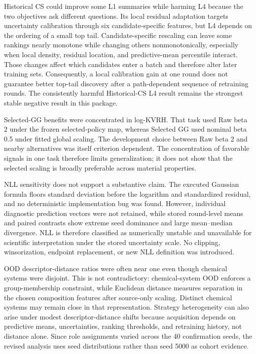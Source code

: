 \documentclass[10pt]{article}
\begin{document}
Historical CS could improve some L1 summaries while harming L4 because the two
objectives ask different questions. Its local residual adaptation targets
uncertainty calibration through six candidate-specific features, but L4
depends on the ordering of a small top tail. Candidate-specific rescaling can
leave some rankings nearly monotone while changing others nonmonotonically,
especially when local density, residual location, and predictive-mean
percentile interact. Those changes affect which candidates enter a batch and
therefore alter later training sets. Consequently, a local calibration gain at
one round does not guarantee better top-tail discovery after a path-dependent
sequence of retraining rounds. The consistently harmful Historical-CS L4
result remains the strongest stable negative result in this package.

Selected-GG benefits were concentrated in log-KVRH. That task used Raw beta 2
under the frozen selected-policy map, whereas Selected GG used nominal beta
0.5 under fitted global scaling. The development choice between Raw beta 2 and
nearby alternatives was itself criterion dependent. The concentration of
favorable signals in one task therefore limits generalization; it does not
show that the selected scaling is broadly preferable across material
properties.

NLL sensitivity does not support a substantive claim. The executed Gaussian
formula floors standard deviation before the logarithm and standardized
residual, and no deterministic implementation bug was found. However,
individual diagnostic prediction vectors were not retained, while stored
round-level means and paired contrasts show extreme seed dominance and large
mean--median divergence. NLL is therefore classified as numerically unstable
and unavailable for scientific interpretation under the stored uncertainty
scale. No clipping, winsorization, endpoint replacement, or new NLL definition
was introduced.

OOD descriptor-distance ratios were often near one even though chemical
systems were disjoint. This is not contradictory: chemical-system OOD enforces
a group-membership constraint, while Euclidean distance measures separation in
the chosen composition features after source-only scaling. Distinct chemical
systems may remain close in that representation. Strategy heterogeneity can
also arise under modest descriptor-distance shifts because acquisition
depends on predictive means, uncertainties, ranking thresholds, and
retraining history, not distance alone. Since role assignments varied across
the 40 confirmation seeds, the revised analysis uses seed distributions rather
than seed 5000 as cohort evidence.
\end{document}
